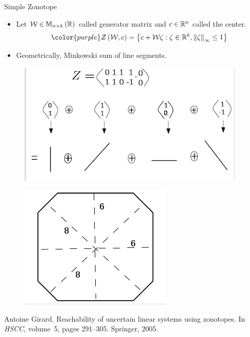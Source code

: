 \begin{frame}{Simple Zonotope}
%
\begin{itemize}
\item Let {\color{purple} $\mathcal{W}\in\mathbb{M}_{n\times k}\left(\mathbb{R}\right)$} called {\color{blue}
generator matrix} and {\color{purple} $c\in\mathbb{R}^n$} called the
{\color{blue} center.}
%
\[
{\color{purple}
\rztope{\stemp}{\cen}=\set{\cen+\stemp\zeta:\zeta\in\reals^k,\infnorm{\zeta}\leq 1}
}
\]
\item Geometrically, {\color{blue} Minkowski sum of line segments}.
\end{itemize}
\begin{minipage}{0.65\textwidth}
\begin{figure}
\includegraphics[trim={2mm 0 2mm 1.5cm},clip,scale=0.45]{figures/rz1.png}
\end{figure}
\end{minipage}
%
\begin{minipage}{0.25\textwidth}
\begin{figure}
\includegraphics[trim={0 3cm 0 0},scale=0.4]{figures/rz2.png}
\end{figure}
\end{minipage}
%
{\small
\begin{thebibliography}{1}

Antoine Girard.
\newblock Reachability of uncertain linear systems using zonotopes.
\newblock In {\em HSCC}, volume~5, pages 291--305. Springer, 2005.

\end{thebibliography}
}
\end{frame}

